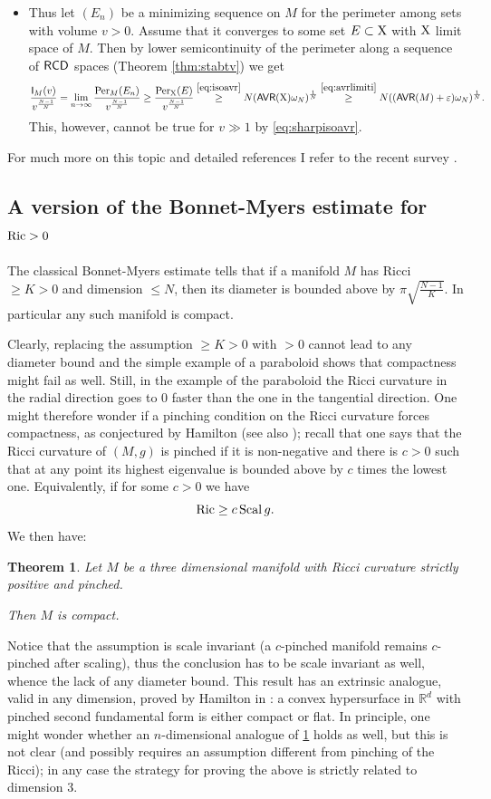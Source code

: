 \documentclass[11pt]{article}
\numberwithin{equation}{section}
\newtheorem{theorem}{Theorem}[section]
\newcommand{\R}{\mathbb{R}}
\newcommand{\X}{{\rm X}}
\newcommand{\RCD}{{\sf RCD}}
\newcommand{\eps}{\varepsilon}
\newcommand{\AVR}{{\sf AVR}}
\begin{document}
\begin{itemize}
\item Thus let $(E_n)$ be a minimizing sequence on $M$ for the perimeter among sets with volume $v>0$. Assume that it converges to some set $E\subset\X$ with $\X$ limit space of $M$.  Then by lower semicontinuity of the perimeter along a sequence of $\RCD$ spaces (Theorem \ref{thm:stabtv}) we get
\[
\frac{{\sf I}_M(v)}{v^{\frac{N-1}N}}=\lim_{n\to\infty}\frac{{\rm Per}_M(E_n)}{v^{\frac{N-1}N}}\geq \frac{{\rm Per}_\X(E)}{v^{\frac{N-1}N}}\stackrel{\eqref{eq:isoavr}}\geq N(\AVR(\X)\omega_N)^{\frac1N}\stackrel{\eqref{eq:avrlimiti}}\geq N((\AVR(M)+\eps)\omega_N)^{\frac1N}.
\]
This, however, cannot be true for $v\gg1$ by \eqref{eq:sharpisoavr}.
\end{itemize}

For much more on this topic and  detailed references I refer to the recent survey \cite{PozzettaSurvey}.

\subsection{A version of the Bonnet-Myers estimate for ${\rm Ric}> 0$}\label{se:bmricci0}
The classical Bonnet-Myers estimate tells that if a manifold $M$ has Ricci $\geq K>0$ and dimension $\leq N$, then its diameter is bounded above by $\pi\sqrt{\tfrac{N-1}K}$.  In particular any such manifold is compact.

Clearly, replacing the assumption  $\geq K>0$ with $>0$ cannot lead to any diameter bound and the simple example of a paraboloid shows that compactness might fail as well. Still, in the example of the paraboloid the Ricci curvature in the radial direction goes to 0 faster than the one in the tangential direction. One might therefore wonder if a pinching condition on the Ricci curvature forces compactness, as conjectured by Hamilton (see also \cite{Lott19}); recall that one says that the Ricci curvature of $(M,g)$ is pinched if it is non-negative and there is $c>0$ such that at any point its  highest eigenvalue is bounded above by $c$ times the lowest one. Equivalently, if for some $c>0$ we have
\begin{equation}
\label{eq:pinch}
{\rm Ric}\geq c\,{\rm Scal}\,g.
\end{equation}
We then have:
\begin{theorem}\label{thm:Riccipinch}
Let $M$ be a three dimensional manifold with Ricci curvature strictly positive  and pinched.

Then $M$ is  compact.
\end{theorem}
Notice that the assumption is scale invariant (a $c$-pinched manifold remains $c$-pinched after scaling), thus the conclusion has to be scale invariant as well, whence the lack of any diameter bound. This result has an extrinsic analogue, valid in any dimension, proved by Hamilton in \cite{Ham94}: a convex hypersurface in $\R^d$ with pinched second fundamental form is either compact or flat. In principle, one might  wonder whether an $n$-dimensional analogue of \ref{thm:Riccipinch} holds as well, but this is not clear (and possibly requires an assumption different from pinching of the Ricci); in any case the strategy for proving the above is strictly related to dimension 3.
\end{document}

